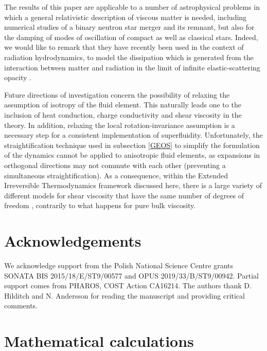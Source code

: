 \documentclass[useAMS,usenatbib,prd,twocolumn,nofootinbib]{revtex4-1}
\begin{document}
The results of this paper are applicable to a number of astrophysical problems in which a general relativistic description of viscous matter is needed, including numerical studies of a binary neutron star merger and its remnant, but also for the damping of modes of oscillation of compact as well as classical stars. Indeed, we would like to remark that they have recently been used in the context of radiation hydrodynamics, to model the dissipation which is generated from the interaction between matter and radiation in the limit of infinite elastic-scattering opacity \citep{gavassino2020radiation}. 

Future directions of investigation concern the possibility of relaxing the assumption of isotropy of the fluid element. This naturally leads one to the inclusion of heat conduction, charge conductivity and shear viscosity in the theory. In addition, relaxing the local rotation-invariance assumption is a necessary step for a consistent implementation of superfluidity. Unfortunately, the straightification technique used in subsection \eqref{GEOS} to simplify the formulation of the dynamics cannot be applied to anisotropic fluid elements, as expansions in orthogonal directions may not commute
with each other (preventing a simultaneous straightification). As a consequence, within the Extended Irreversible Thermodynamics framework discussed here, there is a large variety of different models for shear viscosity that have the same number of degrees of freedom \citep{Hishcock1983,Romatschke2010,Shibata2017}, contrarily to what happens for pure bulk viscosity.








\section*{Acknowledgements}

We acknowledge support from the Polish National Science Centre grants SONATA BIS 2015/18/E/ST9/00577 and OPUS 2019/33/B/ST9/00942. Partial support comes from PHAROS, COST Action CA16214. The authors thank D. Hilditch and N. Andersson for reading
the manuscript and providing critical comments. 

\appendix

\section{Mathematical calculations}
\end{document}

